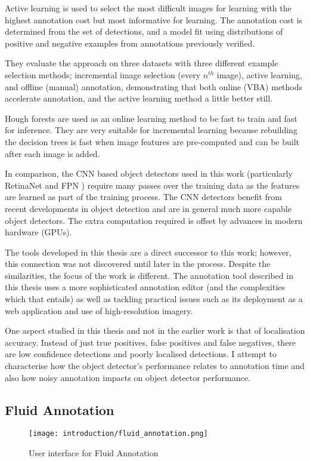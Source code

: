 Active learning is used to select the most difficult images for learning with the highest annotation cost but most informative for learning. The annotation cost is determined from the set of detections, and a model fit using distributions of positive and negative examples from annotations previously verified. 

They evaluate the approach on three datasets with three different example selection methods; incremental image selection (every $n^{th}$ image), active learning, and offline (manual) annotation, demonstrating that both online (\gls{VBA}) methods accelerate annotation, and the active learning method a little better still.

Hough forests \cite{Gall2011} are used as an online learning method to be fast to train and fast for inference. They are very suitable for incremental learning because rebuilding the decision trees is fast when image features are pre-computed and can be built after each image is added. 

In comparison, the \gls{CNN} based object detectors used in this work (particularly RetinaNet \cite{Lin2017} and \gls{FPN} \cite{Lin2017a}) require many passes over the training data as the features are learned as part of the training process. The \gls{CNN} detectors benefit from recent developments in object detection and are in general much more capable object detectors. The extra computation required is offset by advances in modern hardware (\gls{GPU}s).

The tools developed in this thesis are a direct successor to this work; however, this connection was not discovered until later in the process. 
Despite the similarities, the focus of the work is different. The annotation tool described in this thesis uses a more sophisticated annotation editor (and the complexities which that entails) as well as tackling practical issues such as its deployment as a web application and use of high-resolution imagery.

One aspect studied in this thesis and not in the earlier work is that of localisation accuracy. Instead of just true positives, false positives and false negatives, there are low confidence detections and poorly localised detections. I attempt to characterise how the object detector's performance relates to annotation time and also how noisy annotation impacts on object detector performance.


\subsection{Fluid Annotation \cite{Andriluka2018}}
\begin{figure}[h]
  \centering
  \texttt{[image: introduction/fluid\_annotation.png]}
  \caption{User interface for Fluid Annotation \cite{Andriluka2018}}  
  \label{fig:fluid_annotation}
\end{figure}

